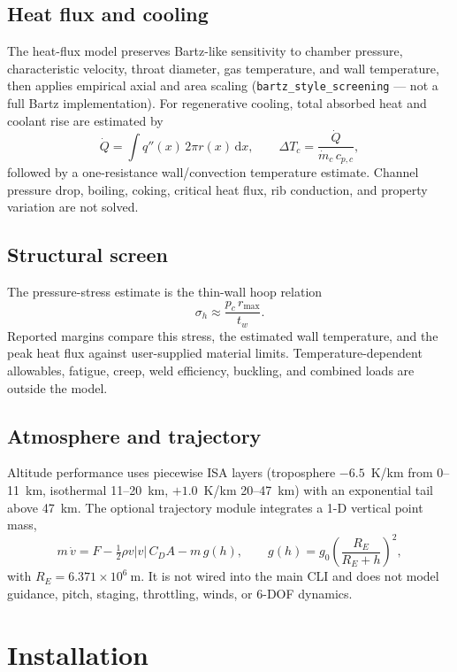 \documentclass[11pt]{article}
\newcommand{\code}[1]{\texttt{#1}}
\begin{document}
\subsection{Heat flux and cooling}
The heat-flux model preserves Bartz-like sensitivity to chamber pressure,
characteristic velocity, throat diameter, gas temperature, and wall
temperature, then applies empirical axial and area scaling
(\code{bartz\_style\_screening} --- not a full Bartz implementation). For
regenerative cooling, total absorbed heat and coolant rise are estimated by
\begin{equation}
\dot Q=\int q''(x)\,2\pi r(x)\,\mathrm{d}x,
\qquad
\Delta T_c=\frac{\dot Q}{\dot m_c\,c_{p,c}},
\end{equation}
followed by a one-resistance wall/convection temperature estimate. Channel
pressure drop, boiling, coking, critical heat flux, rib conduction, and
property variation are not solved.

\subsection{Structural screen}
The pressure-stress estimate is the thin-wall hoop relation
\begin{equation}
\sigma_h\approx\frac{p_c\,r_{\max}}{t_w}.
\end{equation}
Reported margins compare this stress, the estimated wall temperature, and the
peak heat flux against user-supplied material limits. Temperature-dependent
allowables, fatigue, creep, weld efficiency, buckling, and combined loads are
outside the model.

\subsection{Atmosphere and trajectory}
Altitude performance uses piecewise ISA layers (troposphere $-6.5$~K/km from
0--11~km, isothermal 11--20~km, $+1.0$~K/km 20--47~km) with an exponential
tail above 47~km. The optional trajectory module integrates a 1-D vertical
point mass,
\begin{equation}
m\,\dot v=F-\tfrac{1}{2}\rho v|v|\,C_D A-m\,g(h),
\qquad
g(h)=g_0\left(\frac{R_E}{R_E+h}\right)^2,
\end{equation}
with $R_E=6.371\times10^{6}~\mathrm{m}$. It is not wired into the main CLI and
does not model guidance, pitch, staging, throttling, winds, or 6-DOF
dynamics.

\section{Installation}
\end{document}
